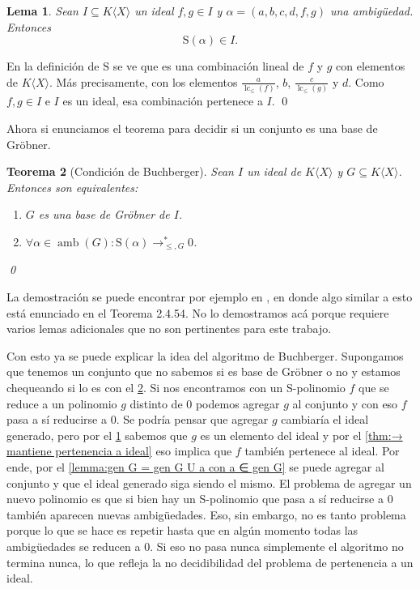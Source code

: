 \documentclass[12pt]{report}
\theoremstyle{customstyle}
\newtheorem{theorem}{Teorema}[chapter]
\newtheorem{lemma}[theorem]{Lema}
\renewenvironment{proof}[1][\proofname]{{\noindent \bfseries #1: }}{\qed} %
\theoremstyle{factstyle}
\DeclareMathOperator{\lc}{lc}
\DeclareMathOperator{\amb}{amb}
\renewcommand{\S}{\text{S}}
\begin{document}
\begin{lemma}\label{lemma:S es cerrado en ideal}
  Sean $I ⊆ K⟨X⟩$ un ideal $f, g ∈ I$ y $α = (a, b, c, d, f, g)$ una ambigüedad. Entonces
  \[ \S(α) ∈ I \text{.}\]
\end{lemma}
\begin{proof}
  En la definición de $\S$ se ve que es una combinación lineal de $f$ y $g$ con elementos de $K⟨X⟩$. Más precisamente, con los elementos $\frac{a}{\lc_≤{(f)}}$, $b$, $\frac{c}{\lc_≤{(g)}}$ y $d$. Como $f, g ∈ I$ e $I$ es un ideal, esa combinación pertenece a $I$.
\end{proof}

Ahora si enunciamos el teorema para decidir si un conjunto es una base de Gröbner.

\begin{theorem}[Condición de Buchberger]\label{thm:condición de Buchberger}
  Sean $I$ un ideal de $K⟨X⟩$ y $G ⊆ K⟨X⟩$. Entonces son equivalentes:
  \begin{enumerate}
    \item $G$ es una base de Gröbner de $I$.
    \item $∀α ∈ \amb(G) : \S(α) →^*_{≤, G} 0$.
  \end{enumerate}
  \qed
\end{theorem}

La demostración se puede encontrar por ejemplo en \cite{phdthesis:Hof23}, en donde algo similar a esto está enunciado en el Teorema 2.4.54. No lo demostramos acá porque requiere varios lemas adicionales que no son pertinentes para este trabajo.

Con esto ya se puede explicar la idea del algoritmo de Buchberger. Supongamos que tenemos un conjunto que no sabemos si es base de Gröbner o no y estamos chequeando si lo es con el \cref{thm:condición de Buchberger}. Si nos encontramos con un S-polinomio $f$ que se reduce a un polinomio $g$ distinto de $0$ podemos agregar $g$ al conjunto y con eso $f$ pasa a sí reducirse a $0$. Se podría pensar que agregar $g$ cambiaría el ideal generado, pero por el \cref{lemma:S es cerrado en ideal} sabemos que $g$ es un elemento del ideal y por el \cref{thm:→ mantiene pertenencia a ideal} eso implica que $f$ también pertenece al ideal. Por ende, por el \cref{lemma:gen G = gen G U a con a ∈ gen G} se puede agregar al conjunto y que el ideal generado siga siendo el mismo. El problema de agregar un nuevo polinomio es que si bien hay un S-polinomio que pasa a sí reducirse a $0$ también aparecen nuevas ambigüedades. Eso, sin embargo, no es tanto problema porque lo que se hace es repetir hasta que en algún momento todas las ambigüedades se reducen a $0$. Si eso no pasa nunca simplemente el algoritmo no termina nunca, lo que refleja la no decidibilidad del problema de pertenencia a un ideal.
\end{document}
